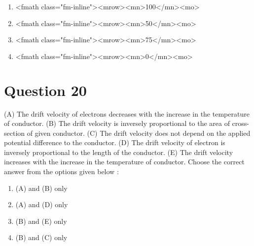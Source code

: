 \documentclass{article}
\begin{document}
\begin{enumerate}[label=(\alph*)]
\item  <fmath class="fm-inline"><mrow><mn>100</mn><mo>%
\item  <fmath class="fm-inline"><mrow><mn>50</mn><mo>%
\item  <fmath class="fm-inline"><mrow><mn>75</mn><mo>%
\item  <fmath class="fm-inline"><mrow><mn>0</mn><mo>%
\end{enumerate}
\newpage
\section*{Question 20}
(A) The drift velocity of electrons decreases with the increase in the temperature of conductor. \newline (B) The drift velocity is inversely proportional to the area of cross-section of given conductor. \newline (C) The drift velocity does not depend on the applied potential difference to the conductor. \newline (D) The drift velocity of electron is inversely proportional to the length of the conductor. \newline (E) The drift velocity increases with the increase in the temperature of conductor. \newline Choose the correct answer from the options given below : \newline 
\begin{enumerate}[label=(\alph*)]
\item  (A) and (B) only
\item  (A) and (D) only
\item  (B) and (E) only
\item  (B) and (C) only
\end{enumerate}
\newpage
\end{document}

